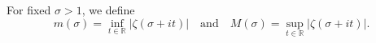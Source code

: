 For fixed $\sigma > 1$, we define
$$m(\sigma) = \inf_{t \in \mathbb{R}} |\zeta(\sigma + it)| \quad \text{and} \quad M(\sigma) = \sup_{t \in \mathbb{R}} |\zeta(\sigma + it)|.$$
